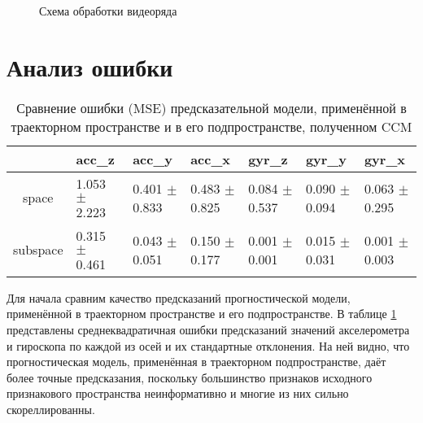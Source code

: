 \documentclass[a4paper, 12pt]{article}
\begin{document}

\begin{figure}[bhtp]
	\centering
	\caption{Схема обработки видеоряда}
	\label{fig:video_data}
\end{figure}

\section{Анализ ошибки}
\begin{table}[bhtp]
	\fontsize{10pt}{14pt}
	\selectfont
	\centering
	\caption{Сравнение ошибки (MSE) предсказательной модели, применённой в траекторном пространстве и в его подпространстве, полученном CCM}
	\label{tbl:space_and_subspace}
	\begin{tabularx}{\textwidth}{c|XXXXXX}
		\hline
		& acc\_z & acc\_y & acc\_x & gyr\_z & gyr\_y & gyr\_x \\
		\hline
		space & 1.053 $\pm$ 2.223 & 0.401 $\pm$ 0.833 & 0.483 $\pm$ 0.825 & 0.084 $\pm$ 0.537 & 0.090 $\pm$ 0.094 & 0.063 $\pm$ 0.295 \\
		subspace & 0.315 $\pm$ 0.461 & 0.043 $\pm$ 0.051 & 0.150 $\pm$ 0.177 & 0.001 $\pm$ 0.001	& 0.015 $\pm$ 0.031 & 0.001 $\pm$ 0.003 \\
		\hline
	\end{tabularx}
\end{table}

Для начала сравним качество предсказаний прогностической модели, применённой в траекторном пространстве и его подпространстве.
В таблице \ref{tbl:space_and_subspace} представлены среднеквадратичная ошибки предсказаний значений акселерометра и гироскопа по каждой из осей и их стандартные отклонения. 
На ней видно, что прогностическая модель, применённая в траекторном подпространстве, даёт более точные предсказания, поскольку большинство признаков исходного признакового пространства неинформативно и многие из них сильно скореллированны.
\end{document}
